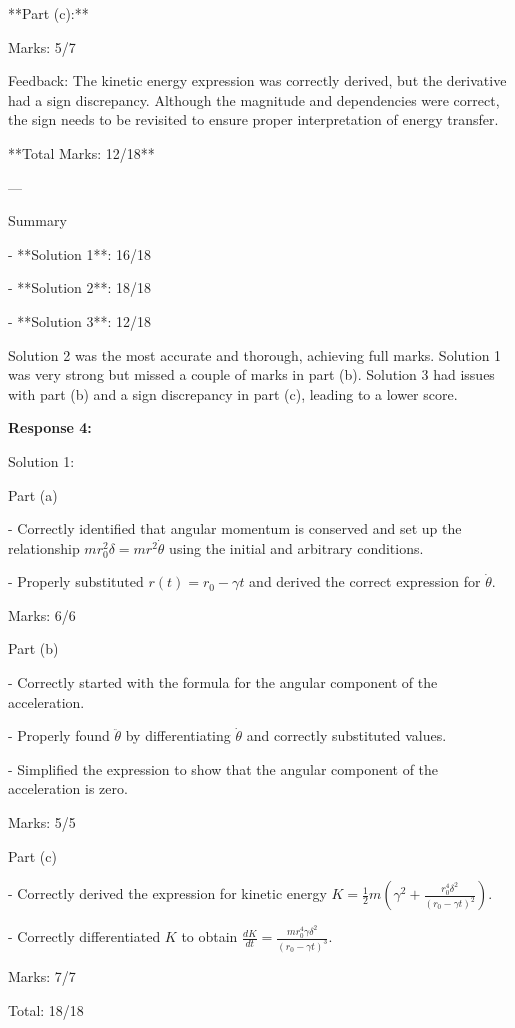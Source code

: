 \documentclass[a4paper,11pt]{article}
\begin{document}
**Part (c):**

Marks: 5/7

Feedback: The kinetic energy expression was correctly derived, but the derivative had a sign discrepancy. Although the magnitude and dependencies were correct, the sign needs to be revisited to ensure proper interpretation of energy transfer.

**Total Marks: 12/18**

---

Summary

- **Solution 1**: 16/18

- **Solution 2**: 18/18

- **Solution 3**: 12/18

Solution 2 was the most accurate and thorough, achieving full marks. Solution 1 was very strong but missed a couple of marks in part (b). Solution 3 had issues with part (b) and a sign discrepancy in part (c), leading to a lower score.

\bigskip
\textbf{Response 4:}

Solution 1: 

Part (a)

- Correctly identified that angular momentum is conserved and set up the relationship \( m r_0^2 \delta = m r^2 \dot{\theta} \) using the initial and arbitrary conditions.

- Properly substituted \( r(t) = r_0 - \gamma t \) and derived the correct expression for \( \dot{\theta} \).

Marks: 6/6

Part (b)

- Correctly started with the formula for the angular component of the acceleration.

- Properly found \( \ddot{\theta} \) by differentiating \( \dot{\theta} \) and correctly substituted values.

- Simplified the expression to show that the angular component of the acceleration is zero.

Marks: 5/5

Part (c)

- Correctly derived the expression for kinetic energy \( K = \frac{1}{2}m (\gamma^2 + \frac{r_0^4 \delta^2}{(r_0 - \gamma t)^2}) \).

- Correctly differentiated \( K \) to obtain \( \frac{dK}{dt} = \frac{m r_0^4 \gamma \delta^2}{(r_0 - \gamma t)^3} \).

Marks: 7/7

Total: 18/18
\end{document}
